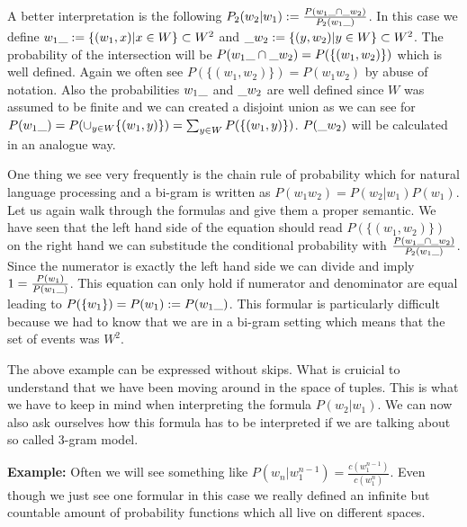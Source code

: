 \documentclass[•]{book}
\begin{document}
A better interpretation is the following $P_2(w_2|w_1):=\frac{P(w_1\_ \cap \_ w_2)}{P_2(w_1\_)}$. 
In this case we define $w_1 \_ := \{(w_1,x)|x\in W\}\subset W^2$ and $\_ w_2 := \{(y,w_2)|y \in W\}\subset W^2$.
The probability of the intersection will be $P(w_1\_ \cap \_ w_2) = P(\{(w_1,w_2)\})$ which is well defined.
Again we often see $P(\{(w_1,w_2)\}) = P(w_1w_2)$ by abuse of notation. 
Also the probabilities $w_1 \_$ and $\_ w_2$ are well defined since $W$ was assumed to be finite and we can created a disjoint union  as we can see for $P(w_1 \_) = P(\cup_{y\in W}\{(w_1,y)\}) = \sum_{y\in W}P(\{(w_1, y)\})$. $P(\_ w_2)$ will be calculated in an analogue way.

One thing we see very frequently is the chain rule of probability which for natural language processing and a bi-gram is written as $P(w_1w_2)=P(w_2|w_1)P(w_1)$.
Let us again walk through the formulas and give them a proper semantic.
We have seen that the left hand side of the equation should read $P(\{(w_1,w_2)\})$ on the right hand we can substitude the conditional probability with $\frac{P(w_1\_ \cap \_ w_2)}{P_2(w_1\_)}$. 
Since the numerator is exactly the left hand side we can divide and imply $1=\frac{P(w_1)}{P(w_1\_)}$. 
This equation can only hold if numerator and denominator are equal leading to $P(\{w_1\})=P(w_1):=P(w_1\_)$.
This formular is particularly difficult because we had to know that we are in a bi-gram setting which means that the set of events was $W^2$.

The above example can be expressed without skips. What is cruicial to understand that we have been moving around in the space of tuples. 
This is what we have to keep in mind when interpreting the formula $P(w_2|w_1)$. 
We can now also ask ourselves how this formula has to be interpreted if we are talking about so called $3$-gram model. 

\textbf{Example:} Often we will see something like $P(w_n|w_1^{n-1})=\frac{c(w_1^{n-1})}{c(w_1^n)}$.
Even though we just see one formular in this case we really defined an infinite but countable amount of probability functions which all live on different spaces. 
\end{document}
